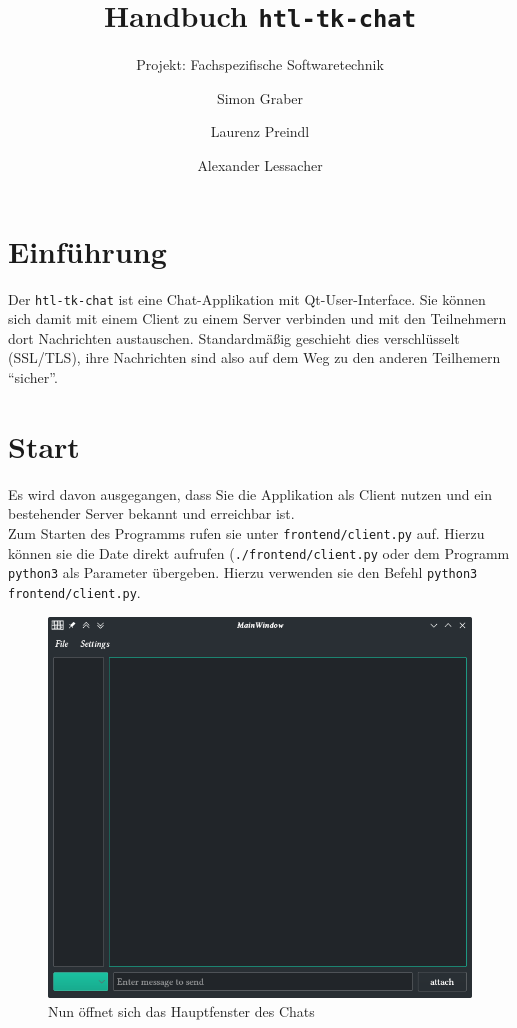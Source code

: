 \documentclass[a4paper,ngerman,headsepline]{scrreprt}
\begin{document}
\title{Handbuch \texttt{htl-tk-chat}}
\subtitle{Projekt: Fachspezifische Softwaretechnik}
\author{Simon Graber \and Laurenz Preindl \and Alexander Lessacher}

\maketitle
\tableofcontents

\section{Einführung}
Der \texttt{htl-tk-chat} ist eine Chat-Applikation mit Qt-User-Interface. Sie können sich damit mit einem Client zu einem Server verbinden und mit den Teilnehmern dort Nachrichten austauschen. Standardmäßig geschieht dies verschlüsselt (SSL/TLS), ihre Nachrichten sind also auf dem Weg zu den anderen Teilhemern \enquote{sicher}.

\section{Start}
Es wird davon ausgegangen, dass Sie die Applikation als Client nutzen und ein bestehender Server bekannt und erreichbar ist.\\
Zum Starten des Programms rufen sie unter \texttt{frontend/client.py} auf. Hierzu können sie die Date direkt aufrufen (\texttt{./frontend/client.py} oder dem Programm \texttt{python3} als Parameter übergeben. Hierzu verwenden sie den Befehl \texttt{python3 frontend/client.py}.

\begin{figure}[ht]\centering
\includegraphics[width=\textwidth]{images/empty}
\caption{Nun öffnet sich das Hauptfenster des Chats}
\end{figure}
\end{document}
